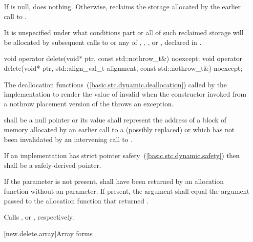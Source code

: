 \begin{itemdescr}
\pnum
{}
If  is null, does nothing. Otherwise, reclaims the
storage allocated by the earlier call to .

\pnum
\remarks
It is unspecified under what conditions part or all of such
%
reclaimed storage will be allocated by subsequent
calls to
or any of
,
,
,
or
,
declared in
.
\end{itemdescr}

%
\begin{itemdecl}
void operator delete(void* ptr, const std::nothrow_t&) noexcept;
void operator delete(void* ptr, std::align_val_t alignment, const std::nothrow_t&) noexcept;
\end{itemdecl}

\begin{itemdescr}
\pnum
\effects
The
deallocation functions~(\ref{basic.stc.dynamic.deallocation})
called by the implementation
to render the value of  invalid
when the constructor invoked from a nothrow
placement version of the  throws an exception.

\pnum
\replaceable
{}

\pnum
\requires
{} shall be a null pointer or
its value shall represent the address of
a block of memory allocated by
an earlier call to a (possibly replaced)
or
which has not been invalidated by an intervening call to
.

\pnum
\requires
If an implementation has strict pointer safety~(\ref{basic.stc.dynamic.safety})
then  shall be a safely-derived pointer.

\pnum
\requires
If the  parameter is not present,
 shall have been returned by an allocation function
without an  parameter.
If present, the  argument
shall equal the  argument
passed to the allocation function that returned . 

\pnum
{}
Calls ,
or ,
respectively.
\end{itemdescr}

[new.delete.array]{Array forms}

